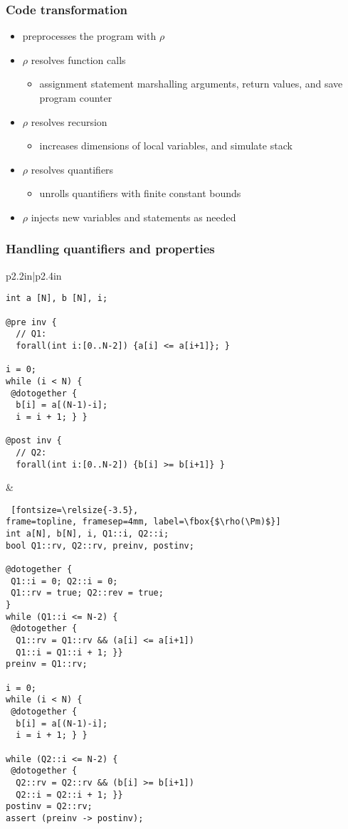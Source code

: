 \begin{frame}[containsverbatim]
\frametitle{Code transformation}
\begin{itemize}
 \item \mytool{} preprocesses the program with $\rho$ 
 \item $\rho$ resolves function calls
 \begin{itemize} \item assignment statement marshalling arguments, return values, and save program counter 
   \end{itemize}
 \item $\rho$ resolves recursion
 \begin{itemize} \item increases dimensions of local variables, and simulate stack 
   \end{itemize}
 \item $\rho$ resolves quantifiers
 \begin{itemize} \item unrolls quantifiers with finite constant bounds
   \end{itemize}
 \item $\rho$ injects new variables and statements  as needed
\end{itemize}
\end{frame}

\begin{frame}[containsverbatim]
\frametitle{Handling quantifiers and properties}
  \begin{tabular}{p{2.2in}|p{2.4in}}
\begin{Verbatim}[fontsize=\relsize{-3.5}, 
frame=topline, framesep=4mm, label=\fbox{\Pm}]
int a [N], b [N], i;

@pre inv {
  // Q1:
  forall(int i:[0..N-2]) {a[i] <= a[i+1]}; }

i = 0;
while (i < N) {
 @dotogether {
  b[i] = a[(N-1)-i];
  i = i + 1; } }
  
@post inv {
  // Q2:
  forall(int i:[0..N-2]) {b[i] >= b[i+1]} }

\end{Verbatim}
& 
\begin{Verbatim} [fontsize=\relsize{-3.5},
frame=topline, framesep=4mm, label=\fbox{$\rho(\Pm)$}]
int a[N], b[N], i, Q1::i, Q2::i;
bool Q1::rv, Q2::rv, preinv, postinv;

@dotogether {
 Q1::i = 0; Q2::i = 0;
 Q1::rv = true; Q2::rev = true;
}
while (Q1::i <= N-2) {
 @dotogether { 
  Q1::rv = Q1::rv && (a[i] <= a[i+1])
  Q1::i = Q1::i + 1; }}
preinv = Q1::rv;

i = 0;
while (i < N) {
 @dotogether {
  b[i] = a[(N-1)-i];
  i = i + 1; } }
  
while (Q2::i <= N-2) {
 @dotogether { 
  Q2::rv = Q2::rv && (b[i] >= b[i+1])
  Q2::i = Q2::i + 1; }}
postinv = Q2::rv;
assert (preinv -> postinv);

\end{Verbatim}
\end{tabular}
\end{frame}

